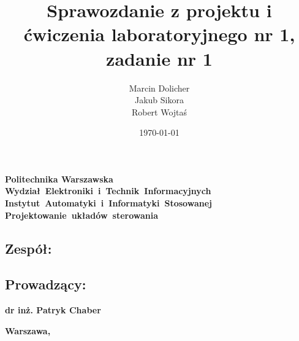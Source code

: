 \documentclass{mwrep}
\title{\bf Sprawozdanie z projektu i ćwiczenia laboratoryjnego nr 1, zadanie nr 1 \vskip 0.1cm}
\author{Marcin Dolicher \\ Jakub Sikora \\ Robert Wojtaś}
\date{\today}
\begin{document}
\frenchspacing
\pagestyle{uheadings}

\makeatletter
\renewcommand{\maketitle}{\begin{titlepage}
		\begin{center}{
				\LARGE {\bf Politechnika Warszawska}}\\
            \vspace{0.4cm}
            \leftskip-0.9cm
            {\LARGE {\bf \mbox{Wydział Elektroniki i Technik Informacyjnych}}}\\
            \vspace{0.2cm}
            {\LARGE {\bf \mbox{Instytut Automatyki i Informatyki Stosowanej}}}\\
            
            \vspace{5cm}
            \leftskip-1.3cm
			{\bf \Huge \mbox{Projektowanie układów sterowania} \vskip 0.1cm}
		\end{center}
		\vspace{0.1cm}

		\begin{center}
			{\bf \LARGE \@title}
		\end{center}

		\vspace{9cm}
		\begin{paracol}{2}
			\addtocontents{toc}{\protect\setcounter{tocdepth}{1}}
			\subsection*{Zespół:}
			\bf{ \Large{ \noindent\@author \par}}
			\addtocontents{toc}{\protect\setcounter{tocdepth}{2}}

			\switchcolumn \addtocontents{toc}{\protect\setcounter{tocdepth}{1}}
			\subsection*{Prowadzący:}
			\bf{\Large{\noindent dr inż. Patryk Chaber}}
			\addtocontents{toc}{\protect\setcounter{tocdepth}{2}}

		\end{paracol}
		\vspace*{\stretch{6}}
		\begin{center}
			\bf{\large{Warszawa, \@date\vskip 0.1cm}}
		\end{center}
	\end{titlepage}
}
\makeatother
\maketitle
\tableofcontents
\end{document}
